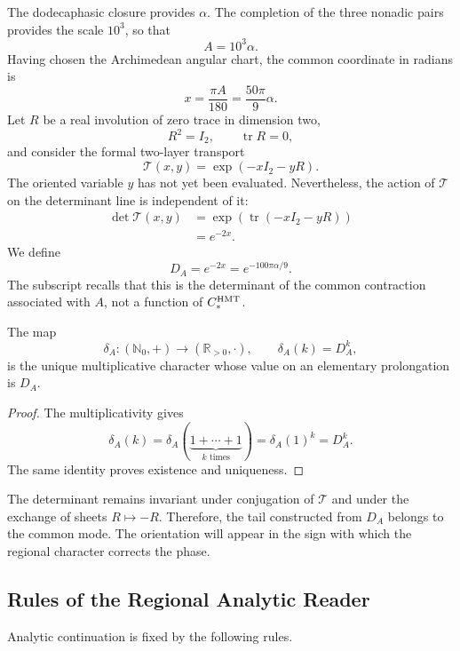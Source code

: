 The dodecaphasic closure provides \(\alpha\). The completion of the three
nonadic pairs provides the scale \(10^3\), so that
\[
A=10^3\alpha.
\]
Having chosen the Archimedean angular chart, the common coordinate in radians is
\[
x=\frac{\pi A}{180}=\frac{50\pi}{9}\alpha.
\]
Let \(R\) be a real involution of zero trace in dimension two,
\[
R^2=I_2,
\qquad
\operatorname{tr}R=0,
\]
and consider the formal two-layer transport
\[
\mathcal T(x,y)=\exp(-xI_2-yR).
\]
The oriented variable \(y\) has not yet been evaluated. Nevertheless, the action
of \(\mathcal T\) on the determinant line is independent of it:
\[
\begin{aligned}
\det\mathcal T(x,y)
&=\exp\!\left(\operatorname{tr}(-xI_2-yR)\right)\\
&=e^{-2x}.
\end{aligned}
\]
We define
\[
\boxed{
D_A=e^{-2x}=e^{-100\pi\alpha/9}.}
\]
The subscript recalls that this is the determinant of the common contraction
associated with \(A\), not a function of \(C_*^{\rm HMT}\).

\begin{proposition}
\label{p12-83-c13-s3:prop:caracter-determinante}
The map
\[
\delta_A:(\mathbb N_0,+)\longrightarrow(\mathbb R_{>0},\cdot),
\qquad
\delta_A(k)=D_A^k,
\]
is the unique multiplicative character whose value on an elementary
prolongation is \(D_A\).
\end{proposition}

\begin{proof}
The multiplicativity gives
\[
\delta_A(k)
=\delta_A(\underbrace{1+\cdots+1}_{k\text{ times}})
=\delta_A(1)^k=D_A^k.
\]
The same identity proves existence and uniqueness.
\end{proof}

The determinant remains invariant under conjugation of
\(\mathcal T\) and under the exchange of sheets \(R\mapsto-R\). Therefore, the
tail constructed from \(D_A\) belongs to the common mode. The orientation
will appear in the sign with which the regional character corrects the phase.

\subsection{Rules of the Regional Analytic Reader}

Analytic continuation is fixed by the following rules.

